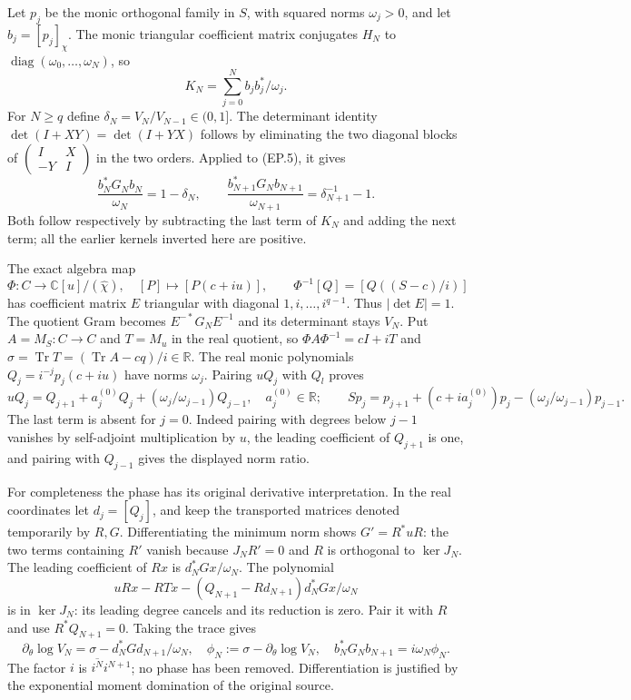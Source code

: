 \documentclass[11pt]{article}
\newcommand{\C}{\mathbb C}\newcommand{\R}{\mathbb R}
\newcommand{\Tr}{\operatorname{Tr}}\newcommand{\diag}{\operatorname{diag}}
\begin{document}
Let $p_j$ be the monic orthogonal family in $S$, with squared norms
$\omega_j>0$, and let $b_j=[p_j]_\chi$. The monic triangular
coefficient matrix conjugates $H_N$ to
$\diag(\omega_0,\ldots,\omega_N)$, so
\[
 K_N=\sum_{j=0}^N b_jb_j^*/\omega_j.\tag{EP.5}
\]
For $N\ge q$ define $\delta_N=V_N/V_{N-1}\in(0,1]$.
The determinant identity $\det(I+XY)=\det(I+YX)$ follows by
eliminating the two diagonal blocks of
$\left(\begin{smallmatrix}I&X\\-Y&I\end{smallmatrix}\right)$
in the two orders. Applied to (EP.5), it gives
\[
 \frac{b_N^*G_Nb_N}{\omega_N}=1-\delta_N,\qquad
 \frac{b_{N+1}^*G_Nb_{N+1}}{\omega_{N+1}}
 =\delta_{N+1}^{-1}-1.\tag{EP.6}
\]
Both follow respectively by subtracting the last term of $K_N$ and
adding the next term; all the earlier kernels inverted here are positive.

The exact algebra map
\[
 \Phi:C\longrightarrow\C[u]/(\widehat\chi),\quad
 [P]\longmapsto[P(c+iu)],\qquad
 \Phi^{-1}[Q]=[Q((S-c)/i)]\tag{EP.7}
\]
has coefficient matrix $E$ triangular with diagonal $1,i,\ldots,i^{q-1}$.
Thus $|\det E|=1$. The quotient Gram becomes
$E^{-*}G_NE^{-1}$ and its determinant stays $V_N$.
Put $A=M_S:C\to C$ and $T=M_u$ in the real quotient, so
$\Phi A\Phi^{-1}=cI+iT$ and
$\sigma=\Tr T=(\Tr A-cq)/i\in\R$.
The real monic polynomials $Q_j=i^{-j}p_j(c+iu)$ have norms
$\omega_j$. Pairing $uQ_j$ with $Q_l$ proves
\[
 uQ_j=Q_{j+1}+a_j^{(0)}Q_j+
       (\omega_j/\omega_{j-1})Q_{j-1},\quad a_j^{(0)}\in\R;
 \qquad
 Sp_j=p_{j+1}+(c+ia_j^{(0)})p_j-
       (\omega_j/\omega_{j-1})p_{j-1}.\tag{EP.8}
\]
The last term is absent for $j=0$. Indeed pairing with degrees below
$j-1$ vanishes by self-adjoint multiplication by $u$, the leading
coefficient of $Q_{j+1}$ is one, and pairing with $Q_{j-1}$ gives
the displayed norm ratio.

For completeness the phase has its original derivative interpretation.
In the real coordinates let $d_j=[Q_j]$, and keep the transported
matrices denoted temporarily by $R,G$. Differentiating the minimum
norm shows $G'=R^*uR$: the two terms containing $R'$ vanish because
$J_NR'=0$ and $R$ is orthogonal to $\ker J_N$. The leading
coefficient of $Rx$ is $d_N^*Gx/\omega_N$. The polynomial
\[
 uRx-RTx-(Q_{N+1}-Rd_{N+1})d_N^*Gx/\omega_N
\]
is in $\ker J_N$: its leading degree cancels and its reduction is zero.
Pair it with $R$ and use $R^*Q_{N+1}=0$. Taking the trace gives
\[
 \partial_\theta\log V_N
 =\sigma-d_N^*Gd_{N+1}/\omega_N,
 \quad \phi_N:=\sigma-\partial_\theta\log V_N,
 \quad b_N^*G_Nb_{N+1}=i\omega_N\phi_N.\tag{EP.9}
\]
The factor $i$ is $\overline{i^N}i^{N+1}$; no phase has been removed.
Differentiation is justified by the exponential moment domination of
the original source.
\end{document}
